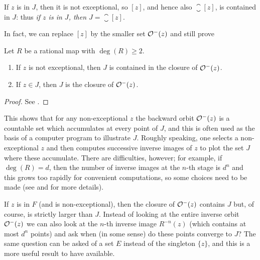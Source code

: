 \begin{remark}[$z$ non-exceptional point and $z \in J \implies J =
    \closure{[z]}$] If $z$ is in $J$, then it is not exceptional, so $[z]$, and
    hence also $\closure{[z]}$, is contained in $J$: thus \emph{if $z$ is in
    $J$, then $J = \closure{[z]}$}. 
\end{remark}

In fact, we can replace $[z]$ by the smaller set $\mathcal{O}^-(z)$ and still prove

\begin{theorem}
    \label{thm:J_contained_in_backwards_orbit_of_z_non_exceptional_and_equal_if_z_in_J}
    Let $R$ be a rational map with $\deg(R) \geq 2$.
    \begin{enumerate}[label=(\roman*)]
        \item If $z$ is not exceptional, then $J$ is contained in the closure of
        $\mathcal{O}^-(z)$.
        \item If $z \in J$, then $J$ is the closure of $\mathcal{O}^-(z)$.
    \end{enumerate}
\end{theorem}
\begin{proof}
    See \cite[71]{Beardon1991}.
\end{proof}

\begin{remark}
    This shows that for any non-exceptional $z$ the backward orbit $\mathcal{O}^-(z)$
    is a countable set which accumulates at every point of $J$, and this is
    often used as the basis of a computer program to illustrate $J$. Roughly
    speaking, one selects a non-exceptional $z$ and then computes successive
    inverse images of $z$ to plot the set $J$ where these accumulate. There are
    difficulties, however; for example, if $\deg(R) = d$, then the number of
    inverse images at the $n$-th stage is $d^n$ and this grows too rapidly for
    convenient computations, so some choices need to be made (see
    \cite{Peitgen1986} and \cite{Barnsley1988} for more details).
\end{remark}

If $z$ is in $F$ (and is non-exceptional), then the closure of $\mathcal{O}^-(z)$
contains $J$ but, of course, is strictly larger than $J$. Instead of looking at
the entire inverse orbit $\mathcal{O}^-(z)$ we can also look at the $n$-th inverse
image $R^{-n}(z)$ (which contains at most $d^n$ points) and ask when (in some
sense) do these points converge to $J$? The same question can be asked of a set
$E$ instead of the singleton $\{z\}$, and this is a more useful result to have
available.

